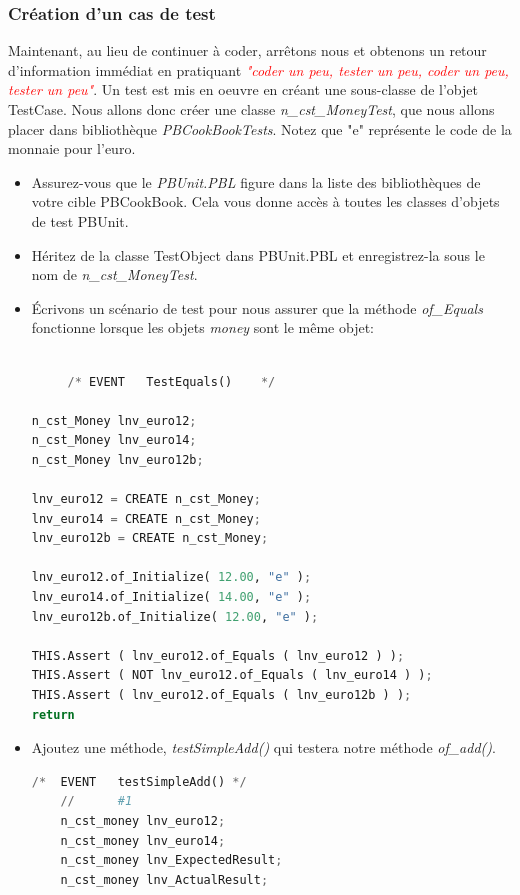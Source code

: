 \documentclass[french]{article}
\theoremstyle{definition}
\begin{document}
\subsubsection{Création d'un cas de test}
Maintenant, au lieu de continuer à coder, arrêtons nous et obtenons un retour d'information immédiat en pratiquant 
\textit{\textcolor{red}{"coder un peu, tester un peu, coder un peu, tester un peu"}}.
Un test est mis en oeuvre  en créant une sous-classe de l'objet TestCase.
Nous allons donc créer une classe \textit{n\_cst\_MoneyTest}, que nous allons  placer dans bibliothèque  \textit{PBCookBookTests}.  
Notez que "e" représente le code de la monnaie pour l'euro.
\begin{itemize}
    \item Assurez-vous que le \textit{PBUnit.PBL} figure dans la liste des bibliothèques de votre cible PBCookBook. 
     Cela vous donne accès à toutes les classes d'objets de test PBUnit.
    \item Héritez de la classe TestObject dans PBUnit.PBL et enregistrez-la sous le nom de \textit{n\_cst\_MoneyTest}.
    \item Écrivons un scénario de test pour nous assurer que la méthode \textit{of\_Equals} fonctionne lorsque les objets \textit{money} sont le même objet:
  
 \begin{lstlisting}[language=Python, caption=Test d'égalité de deux \textit{money}]

     /*	EVENT	TestEquals()	*/

n_cst_Money	lnv_euro12;
n_cst_Money	lnv_euro14;
n_cst_Money	lnv_euro12b;

lnv_euro12 = CREATE n_cst_Money;
lnv_euro14 = CREATE n_cst_Money;
lnv_euro12b = CREATE n_cst_Money;

lnv_euro12.of_Initialize( 12.00, "e" );
lnv_euro14.of_Initialize( 14.00, "e" );
lnv_euro12b.of_Initialize( 12.00, "e" );

THIS.Assert ( lnv_euro12.of_Equals ( lnv_euro12 ) );
THIS.Assert ( NOT lnv_euro12.of_Equals ( lnv_euro14 ) );
THIS.Assert ( lnv_euro12.of_Equals ( lnv_euro12b ) );
return
\end{lstlisting}
\item Ajoutez une méthode, \textit{testSimpleAdd()} qui testera notre méthode  \textit{of\_add()}.

\begin{lstlisting}[language=Python, caption=Test d'addition de deux \textit{money}]
    /*	EVENT	testSimpleAdd()	*/
    //		#1
    n_cst_money	lnv_euro12;
    n_cst_money	lnv_euro14;
    n_cst_money	lnv_ExpectedResult;
    n_cst_money	lnv_ActualResult;
    

\end{lstlisting}
\end{itemize}
\end{document}
